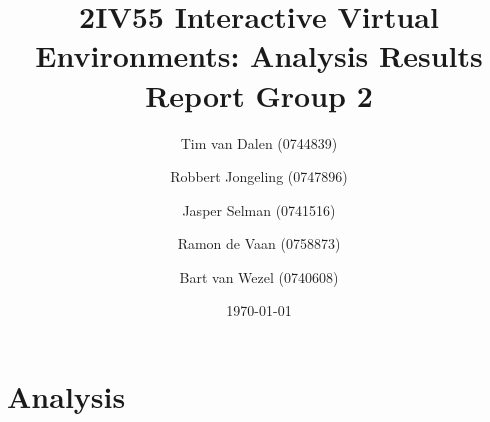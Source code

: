 \documentclass[a4paper,11pt]{article}
\title{
	2IV55 Interactive Virtual Environments: Analysis Results Report Group 2
}
\author{
	Tim van Dalen (0744839)
	\and
	Robbert Jongeling (0747896)
	\and
	Jasper Selman (0741516)
	\and
	Ramon de Vaan (0758873)
	\and
	Bart van Wezel (0740608)
}
\date{\today}
\begin{document}
	\maketitle
	
	\section{Analysis}
	\label{sec:analysis}
	
	
	
\end{document}
